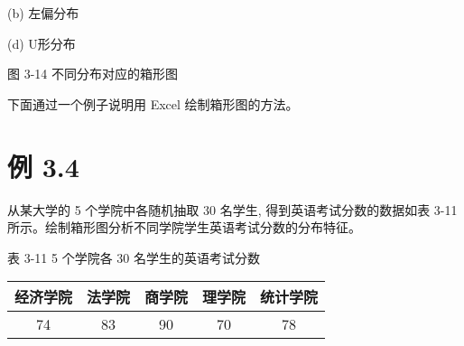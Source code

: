 \documentclass[10pt]{article}
\begin{document}
\begin{CJK*}{UTF8}{bsmi}
(b) 左偏分布

\begin{center}
\end{center}

(d) U形分布

图 3-14 不同分布对应的箱形图

下面通过一个例子说明用 Excel 绘制箱形图的方法。

\section*{例 3.4}
从某大学的 5 个学院中各随机抽取 30 名学生, 得到英语考试分数的数据如表 3-11 所示。绘制箱形图分析不同学院学生英语考试分数的分布特征。

表 3-11 5 个学院各 30 名学生的英语考试分数

\begin{center}
\begin{tabular}{ccccc}
\hline
经济学院 & 法学院 & 商学院 & 理学院 & 统计学院 \\
\hline
74 & 83 & 90 & 70 & 78 \\
\hline
\end{tabular}
\end{center}


\end{CJK*}
\end{document}
